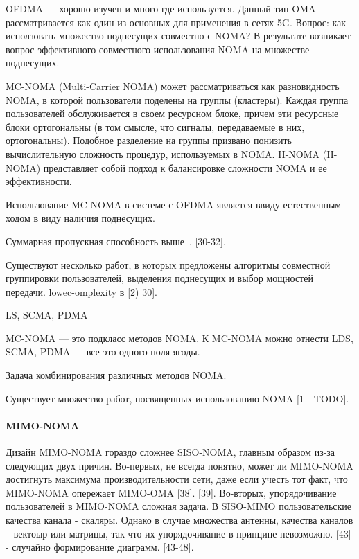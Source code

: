 \documentclass{book}
\numberwithin{theorem}{chapter}
\numberwithin{statement}{chapter}
\numberwithin{lemma}{chapter}
\theoremstyle{definition}
\numberwithin{task}{chapter}
\theoremstyle{remark}
\numberwithin{example}{chapter}
\theoremstyle{definition}
\numberwithin{definition}{chapter}
\theoremstyle{remark}
\theoremstyle{remark}
\numberwithin{lyrics}{section}
\begin{document}
OFDMA --- хорошо изучен и много где используется. Данный тип OMA рассматривается как один из основных для применения в сетях 5G. Вопрос: как исползовать множество поднесущих совместно с NOMA? В результате возникает вопрос эффективного совместного использования NOMA на множестве поднесущих.

MC-NOMA (Multi-Carrier NOMA) может рассматриваться как разновидность NOMA, в которой пользователи поделены на группы (кластеры). Каждая группа пользователей обслуживается в своем ресурсном блоке, причем эти ресурсные блоки ортогональны (в том смысле, что сигналы, передаваемые в них, ортогональны). Подобное разделение на группы призвано понизить вычислительную сложность процедур, используемых в NOMA. H-NOMA (H-NOMA) представляет собой подход к балансировке сложности NOMA и ее эффективности.

Использование MC-NOMA в системе с OFDMA является ввиду естественным ходом в виду наличия поднесущих. 

Суммарная пропускная способность выше~\cite{ding2014impact}. [30-32]. 

Существуют несколько работ, в которых предложены алгоритмы совместной группировки пользователей, выделения поднесущих и выбор мощностей передачи. lowec-omplexity в [2) 30].

LS, SCMA, PDMA

MC-NOMA --- это подкласс методов NOMA. К MC-NOMA можно отнести LDS, SCMA, PDMA --- все это одного поля ягоды. 

Задача комбинирования различных методов NOMA.

	

	
	
	
	
	Существует множество работ, посвященных использованию NOMA [1 - TODO]. 
	
	
	
	
	\paragraph{MIMO-NOMA}
	Дизайн MIMO-NOMA гораздо сложнее SISO-NOMA, главным образом из-за следующих двух причин. Во-первых, не всегда понятно, может ли MIMO-NOMA достигнуть максимума производительности сети, даже если учесть тот факт, что MIMO-NOMA опережает MIMO-OMA [38]. [39]. 
	Во-вторых, упорядочивание пользователей в MIMO-NOMA сложная задача. В SISO-MIMO пользовательские качества канала - скаляры. Однако в случае множества антенны, качества каналов -- вектоыр или матрицы, так что их упорядочивание в принципе невозможно. [43] - случайно формирование диаграмм. [43-48].
	
\end{document}

